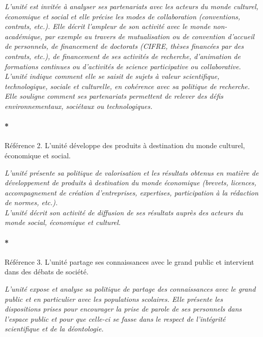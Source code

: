 \documentclass[]{article}
\let\oldparagraph\paragraph
\renewcommand{\paragraph}[1]{\oldparagraph{#1}\mbox{}}
\newcommand{\instructions}[1]{{\em \color{hceresgreen}#1}}
\begin{document}
\instructions{L’unité est invitée à analyser ses partenariats avec les acteurs du monde culturel, économique et social et elle précise les modes de collaboration (conventions, contrats, etc.). Elle décrit l’ampleur de son activité avec le monde non-académique, par exemple au travers de mutualisation ou de convention d’accueil de personnels, de financement de doctorats (CIFRE, thèses financées par des contrats, etc.), de financement de ses activités de recherche, d’animation de formations continues ou d’activités de science participative ou collaborative.\\

L’unité indique comment elle se saisit de sujets à valeur scientifique, technologique, sociale et culturelle, en cohérence avec sa politique de recherche. Elle souligne comment ses partenariats permettent de relever des défis environnementaux, sociétaux ou technologiques.
}

\paragraph*{Référence 2. L'unité développe des produits à destination du
monde culturel, économique et social.}

\instructions{L’unité présente sa politique de valorisation et les résultats obtenus en matière de développement de produits à destination du monde économique (brevets, licences, accompagnement de création d’entreprises, expertises, participation à la rédaction de normes, etc.).\\

L’unité décrit son activité de diffusion de ses résultats auprès des acteurs du monde social, économique et culturel.}

\paragraph*{Référence 3. L'unité partage ses connaissances avec le grand
public et intervient dans des débats de société.}

\instructions{L’unité expose et analyse sa politique de partage des connaissances avec le grand public et en particulier avec les populations scolaires. Elle présente les dispositions prises pour encourager la prise de parole de ses personnels dans l’espace public et pour que celle-ci se fasse dans le respect de l’intégrité scientifique et de la déontologie.}
\end{document}
